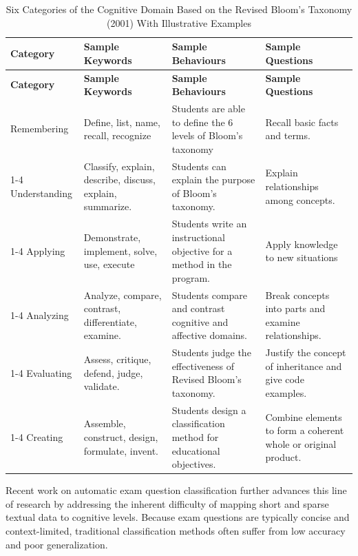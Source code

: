 {
\setlength{\LTleft}{-1.7cm}
\setlength{\LTright}{0pt}
\begin{longtable}{l p{} p{} p{}}
    \caption{Six Categories of the Cognitive Domain Based on the Revised Bloom’s Taxonomy (2001) With Illustrative Examples}
    \label{tab:bloom}
    \\

    \hline
    \textbf{Category} & \textbf{Sample Keywords} & \textbf{Sample Behaviours} & \textbf{Sample Questions} \\
    \hline
    \endfirsthead

    \hline
    \textbf{Category} & \textbf{Sample Keywords} & \textbf{Sample Behaviours} & \textbf{Sample Questions} \\
    \hline
    \endhead

    \hline
    \endfoot

    Remembering & Define, list, name, recall, recognize & Students are able to define the 6 levels of Bloom's taxonomy & Recall basic facts and terms. \\
    \cline{1-4}
    Understanding & Classify, explain, describe, discuss, explain, summarize. & Students can explain the purpose of Bloom's taxonomy. & Explain relationships among concepts. \\
    \cline{1-4}
    Applying & Demonstrate, implement, solve, use, execute & Students write an instructional objective for a method in the program. & Apply knowledge to new situations \\
    \cline{1-4}
    Analyzing & Analyze, compare, contrast, differentiate, examine. & Students compare and contrast cognitive and affective domains. & Break concepts into parts and examine relationships. \\
    \cline{1-4}
    Evaluating & Assess, critique, defend, judge, validate. & Students judge the effectiveness of Revised Bloom's taxonomy. & Justify the concept of inheritance and give code examples. \\
    \cline{1-4}
    Creating & Assemble, construct, design, formulate, invent. & Students design a classification method for educational objectives. &  Combine elements to form a coherent whole or original product. \\
    
\end{longtable}
}

Recent work on automatic exam question classification further 
advances this line of research by addressing the inherent 
difficulty of mapping short and sparse textual data to 
cognitive levels. Because exam questions are typically 
concise and context-limited, traditional classification 
methods often suffer from low accuracy and poor generalization.

